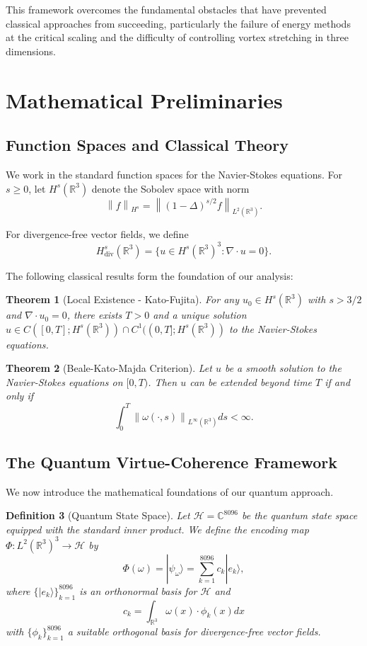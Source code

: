 \documentclass[11pt]{article}
\newtheorem{theorem}{Theorem}[section]
\newtheorem{definition}[theorem]{Definition}
\newcommand{\R}{\mathbb{R}}
\newcommand{\C}{\mathbb{C}}
\newcommand{\HH}{\mathcal{H}}
\newcommand{\norm}[1]{\left\|#1\right\|}
\newcommand{\divergence}{\nabla \cdot}
\newcommand{\laplacian}{\Delta}
\begin{document}
This framework overcomes the fundamental obstacles that have prevented classical approaches from succeeding, particularly the failure of energy methods at the critical scaling and the difficulty of controlling vortex stretching in three dimensions.

\section{Mathematical Preliminaries}

\subsection{Function Spaces and Classical Theory}

We work in the standard function spaces for the Navier-Stokes equations. For $s \geq 0$, let $H^s(\R^3)$ denote the Sobolev space with norm
\[
\norm{f}_{H^s} = \norm{(1-\laplacian)^{s/2} f}_{L^2(\R^3)}.
\]

For divergence-free vector fields, we define
\[
H^s_{\text{div}}(\R^3) = \{u \in H^s(\R^3)^3 : \divergence u = 0\}.
\]

The following classical results form the foundation of our analysis:

\begin{theorem}[Local Existence - Kato-Fujita]\label{thm:local}
For any $u_0 \in H^s(\R^3)$ with $s > 3/2$ and $\divergence u_0 = 0$, there exists $T > 0$ and a unique solution $u \in C([0,T]; H^s(\R^3)) \cap C^1((0,T]; H^s(\R^3))$ to the Navier-Stokes equations.
\end{theorem}

\begin{theorem}[Beale-Kato-Majda Criterion]\label{thm:bkm}
Let $u$ be a smooth solution to the Navier-Stokes equations on $[0,T)$. Then $u$ can be extended beyond time $T$ if and only if
\[
\int_0^T \norm{\omega(\cdot,s)}_{L^\infty(\R^3)} ds < \infty.
\]
\end{theorem}

\subsection{The Quantum Virtue-Coherence Framework}

We now introduce the mathematical foundations of our quantum approach.

\begin{definition}[Quantum State Space]\label{def:hilbert}
Let $\HH = \C^{8096}$ be the quantum state space equipped with the standard inner product. We define the encoding map $\Phi: L^2(\R^3)^3 \to \HH$ by
\[
\Phi(\omega) = |\psi_\omega\rangle = \sum_{k=1}^{8096} c_k |e_k\rangle,
\]
where $\{|e_k\rangle\}_{k=1}^{8096}$ is an orthonormal basis for $\HH$ and
\[
c_k = \int_{\R^3} \omega(x) \cdot \phi_k(x) dx
\]
with $\{\phi_k\}_{k=1}^{8096}$ a suitable orthogonal basis for divergence-free vector fields.
\end{definition}
\end{document}

